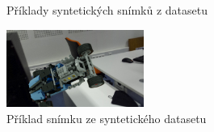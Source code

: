 \begin{figure}[ht]
\hspace{\hspacesize}%
\hspace{\hspacesize}%
\subfloat{%
  \hspace{\imagewidth}
}

\caption[Příklady syntetických snímků z datasetu]{Příklady syntetických snímků z datasetu}
\label{fig:synthetic_images}
\end{figure}


\begin{figure}[hb]
\centering
\includegraphics[width=0.4\textwidth,keepaspectratio]{Figures/train_EA408_199.png}
\caption{Příklad snímku ze syntetického datasetu}
\label{fig:trainimg}
\end{figure}